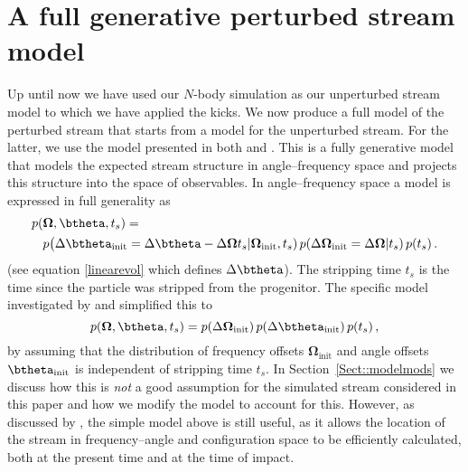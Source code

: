 \documentclass[useAMS,usenatbib,fleqn,a4paper]{mn2e}
\begin{document}
\section{A full generative perturbed stream model}\label{Sect::FULL}
Up until now we have used our $N$-body simulation as our unperturbed stream model to which we have applied the kicks. We now produce a full model of the perturbed stream that starts from a model for the unperturbed stream. For the latter, we use the model presented in both \cite{Bovy2014} and \cite{Sanders2014}. This is a fully generative model that models the expected stream structure in angle--frequency space and projects this structure into the space of observables. In angle--frequency space a model is expressed in full generality as
\begin{equation}
\begin{split}
p(&\boldsymbol{\Omega},\btheta,t_s) =\\
 & p\big(\Delta\btheta_\mathrm{init}=\Delta\btheta-\Delta\boldsymbol{\Omega}t_s|\boldsymbol{\Omega}_\mathrm{init},t_s)\,p(\Delta\boldsymbol{\Omega}_\mathrm{init}=\Delta\boldsymbol{\Omega}|t_s)\,p(t_s)\,.
\end{split}
\end{equation}
(see equation \eqref{linearevol} which defines $\Delta\btheta$). The stripping time $t_s$ is the time since the particle was stripped from the progenitor. The specific model investigated by \cite{Bovy2014} and \cite{Sanders2014} simplified this to
\begin{equation}\label{eq:simplemodel}
p(\boldsymbol{\Omega},\btheta,t_s) = p(\Delta\boldsymbol{\Omega}_\mathrm{init})\, p(\Delta\btheta_\mathrm{init})\,p(t_s)\,,
\end{equation}
by assuming that the distribution of frequency offsets $\boldsymbol{\Omega}_\mathrm{init}$ and angle offsets $\btheta_\mathrm{init}$ is independent of stripping time $t_s$. In Section~\ref{Sect::modelmods} we discuss how this is \emph{not} a good assumption for the simulated stream considered in this paper and how we modify the model to account for this. However, as discussed by \cite{Bovy2014}, the simple model above is still useful, as it allows the location of the stream in frequency--angle and configuration space to be efficiently calculated, both at the present time and at the time of impact.
\end{document}
